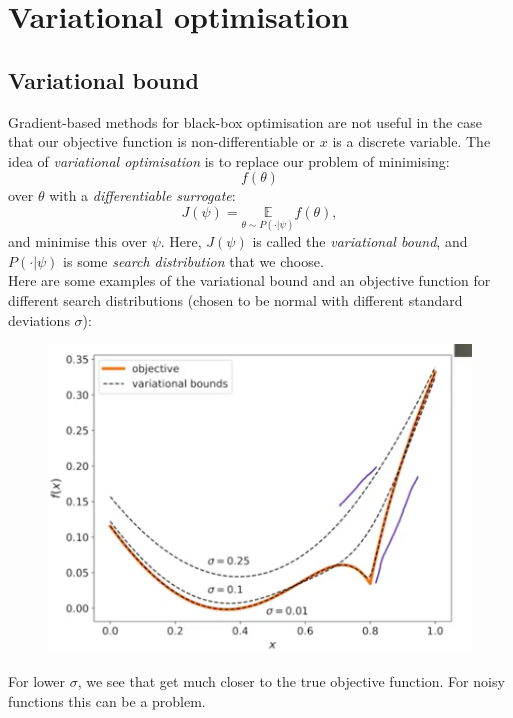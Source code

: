 \newpage
\section{Variational optimisation}

\subsection{Variational bound}
Gradient-based methods for black-box optimisation are not useful in the case that our objective function is non-differentiable or $x$ is a discrete variable. The idea of \textit{variational optimisation} is to replace our problem of minimising:
\begin{equation*}
f(\theta)
\end{equation*}
over $\theta$ with a \textit{differentiable surrogate}:
\begin{equation*}
J(\psi) = \underset{\theta \sim P(\cdot|\psi)}{\mathbb{E}} f(\theta),
\end{equation*}
and minimise this over $\psi$. Here, $J(\psi)$ is called the \textit{variational bound}, and $P(\cdot | \psi)$ is some \textit{search distribution} that we choose.\\

Here are some examples of the variational bound and an objective function for different search distributions (chosen to be normal with different standard deviations $\sigma$):
\begin{figure}[H]
\centering
\includegraphics[scale=0.4]{variationalbounds.png}
\end{figure}
For lower $\sigma$, we see that get much closer to the true objective function. For noisy functions this can be a problem.\\

